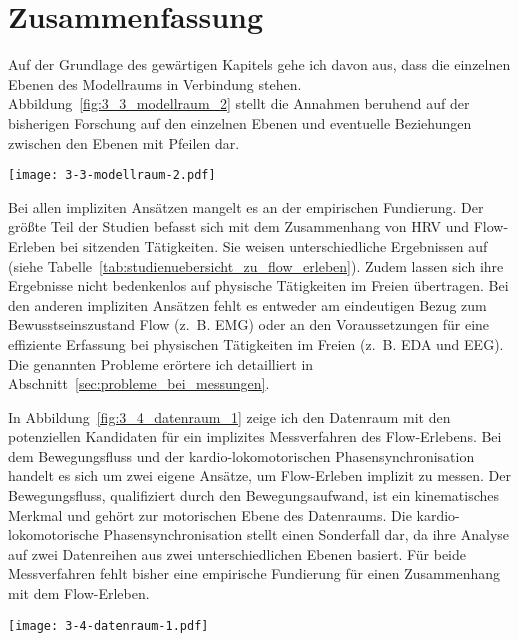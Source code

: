 \section{Zusammenfassung}
\label{zusammenfassung_3}
Auf der Grundlage des gewärtigen Kapitels gehe ich davon aus, dass die einzelnen Ebenen des Modellraums in Verbindung stehen. Abbildung~\ref{fig:3_3_modellraum_2} stellt die Annahmen beruhend auf der bisherigen Forschung auf den einzelnen Ebenen und eventuelle Beziehungen zwischen den Ebenen mit Pfeilen dar.

\begin{sidewaysfigure}
	\texttt{[image: 3-3-modellraum-2.pdf]}
	\caption[Ein Modellraum des Flow-Erlebens (Ergänzung)]{Ein Modellraum des Flow-Erlebens (Ergänzung). Quelle: Eigene Darstellung}
	\label{fig:3_3_modellraum_2}
\end{sidewaysfigure}

Bei allen impliziten Ansätzen mangelt es an der empirischen Fundierung. Der größte Teil der Studien befasst sich mit dem Zusammenhang von \ac{HRV} und Flow-Erleben bei sitzenden Tätigkeiten. Sie weisen unterschiedliche Ergebnissen auf (siehe Tabelle~\ref{tab:studienuebersicht_zu_flow_erleben}). Zudem lassen sich ihre Ergebnisse nicht bedenkenlos auf physische Tätigkeiten im Freien übertragen. Bei den anderen impliziten Ansätzen fehlt es entweder am eindeutigen Bezug zum Bewusstseinszustand Flow (z.~B. \ac{EMG}) oder an den Voraussetzungen für eine effiziente Erfassung bei physischen Tätigkeiten im Freien (z.~B. \ac{EDA} und \ac{EEG}). Die genannten Probleme erörtere ich detailliert in Abschnitt~\ref{sec:probleme_bei_messungen}.

In Abbildung~\ref{fig:3_4_datenraum_1} zeige ich den Datenraum mit den potenziellen Kandidaten für ein implizites Messverfahren des Flow-Erlebens. Bei dem Bewegungsfluss und der kardio-lokomotorischen Phasensynchronisation handelt es sich um zwei eigene Ansätze, um Flow-Erleben implizit zu messen. Der Bewegungsfluss, qualifiziert durch den Bewegungsaufwand, ist ein kinematisches Merkmal und gehört zur motorischen Ebene des Datenraums. Die kardio-lokomotorische Phasensynchronisation stellt einen Sonderfall dar, da ihre Analyse auf zwei Datenreihen aus zwei unterschiedlichen Ebenen basiert. Für beide Messverfahren fehlt bisher eine empirische Fundierung für einen Zusammenhang mit dem Flow-Erleben.

\begin{sidewaysfigure}
	\texttt{[image: 3-4-datenraum-1.pdf]}
	\caption[Ein Datenraum für die Entwicklung eines impliziten Messverfahrens des Flow-Erlebens]{Ein Datenraum für die Entwicklung eines impliziten Messverfahrens des Flow-Erlebens. \\ \hspace{\textwidth}Quelle: Eigene Darstellung}
	\label{fig:3_4_datenraum_1}
\end{sidewaysfigure}